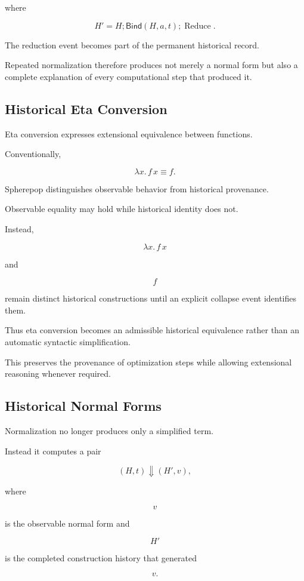 \documentclass[12pt,oneside]{article}
\theoremstyle{definition}
\theoremstyle{remark}
\newcommand{\Bind}{\mathsf{Bind}}
\begin{document}
where

\[
H'
=
H;
\Bind(H,a,t);
\operatorname{Reduce}.
\]

The reduction event becomes part of the permanent historical record.

Repeated normalization therefore produces not merely a normal form but also a
complete explanation of every computational step that produced it.

\subsection{Historical Eta Conversion}

Eta conversion expresses extensional equivalence between functions.

Conventionally,

\[
\lambda x.\,f\,x
\equiv
f.
\]

Spherepop distinguishes observable behavior from historical provenance.

Observable equality may hold while historical identity does not.

Instead,

\[
\lambda x.\,f\,x
\]

and

\[
f
\]

remain distinct historical constructions until an explicit collapse event
identifies them.

Thus eta conversion becomes an admissible historical equivalence rather than an
automatic syntactic simplification.

This preserves the provenance of optimization steps while allowing extensional
reasoning whenever required.

\subsection{Historical Normal Forms}

Normalization no longer produces only a simplified term.

Instead it computes a pair

\[
(H,t)
\Downarrow
(H',v),
\]

where

\[
v
\]

is the observable normal form and

\[
H'
\]

is the completed construction history that generated

\[
v.
\]
\end{document}
